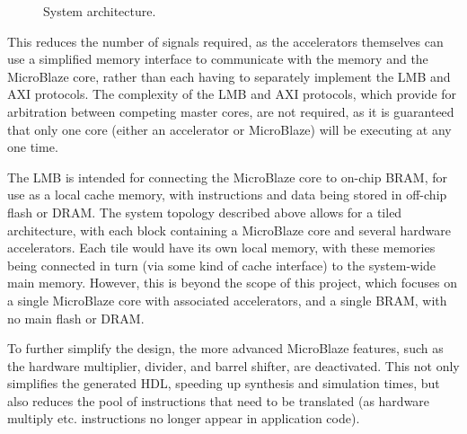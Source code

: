 \documentclass{UoYCSproject}
\begin{document}
\begin{figure}[H]
\caption{System architecture.}
\label{fig:systemArchitecture}
\end{figure}

This reduces the number of signals required, as the accelerators themselves can use a simplified memory interface to communicate
with the memory and the MicroBlaze core, rather than each having to separately implement the LMB and AXI protocols.
The complexity of the LMB and AXI protocols, which provide for arbitration between competing master cores, are not required,
as it is guaranteed that only one core (either an accelerator or MicroBlaze) will be executing at any one time.

The LMB is intended for connecting the MicroBlaze core to on-chip BRAM, for use as a local cache memory, with instructions
and data being stored in off-chip flash or DRAM. The system topology described above allows for a tiled architecture,
with each block containing a MicroBlaze core and several hardware accelerators. Each tile would have its own local memory,
with these memories being connected in turn (via some kind of cache interface) to the system-wide main memory. However,
this is beyond the scope of this project, which focuses on a single MicroBlaze core with associated accelerators,
and a single BRAM, with no main flash or DRAM.

To further simplify the design, the more advanced MicroBlaze features, such as the hardware multiplier, divider, and barrel
shifter, are deactivated. This not only simplifies the generated HDL, speeding up synthesis and simulation times, but also
reduces the pool of instructions that need to be translated (as hardware multiply etc. instructions no longer appear in
application code).
\end{document}
